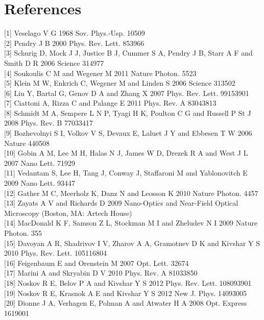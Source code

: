 \documentclass[10pt]{article}
\begin{document}
\section*{References}
[1] Veselago V G 1968 Sov. Phys.-Usp. 10509\\[0pt]
[2] Pendry J B 2000 Phys. Rev. Lett. 853966\\[0pt]
[3] Schurig D, Mock J J, Justice B J, Cummer S A, Pendry J B, Starr A F and Smith D R 2006 Science 314977\\[0pt]
[4] Soukoulis C M and Wegener M 2011 Nature Photon. 5523\\[0pt]
[5] Klein M W, Enkrich C, Wegener M and Linden S 2006 Science 313502\\[0pt]
[6] Liu Y, Bartal G, Genov D A and Zhang X 2007 Phys. Rev. Lett. 99153901\\[0pt]
[7] Ciattoni A, Rizza C and Palange E 2011 Phys. Rev. A 83043813\\[0pt]
[8] Schmidt M A, Sempere L N P, Tyagi H K, Poulton C G and Russell P St J 2008 Phys. Rev. B 77033417\\[0pt]
[9] Bozhevolnyi S I, Volkov V S, Devaux E, Laluet J Y and Ebbesen T W 2006 Nature 440508\\[0pt]
[10] Gobin A M, Lee M H, Halas N J, James W D, Drezek R A and West J L 2007 Nano Lett. 71929\\[0pt]
[11] Vedantam S, Lee H, Tang J, Conway J, Staffaroni M and Yablonovitch E 2009 Nano Lett. 93447\\[0pt]
[12] Gather M C, Meerholz K, Danz N and Leosson K 2010 Nature Photon. 4457\\[0pt]
[13] Zayats A V and Richards D 2009 Nano-Optics and Near-Field Optical Microscopy (Boston, MA: Artech House)\\[0pt]
[14] MacDonald K F, Samson Z L, Stockman M I and Zheludev N I 2009 Nature Photon. 355\\[0pt]
[15] Davoyan A R, Shadrivov I V, Zharov A A, Gramotnev D K and Kivshar Y S 2010 Phys. Rev. Lett. 105116804\\[0pt]
[16] Feigenbaum E and Orenstein M 2007 Opt. Lett. 32674\\[0pt]
[17] Marini A and Skryabin D V 2010 Phys. Rev. A 81033850\\[0pt]
[18] Noskov R E, Belov P A and Kivshar Y S 2012 Phys. Rev. Lett. 108093901\\[0pt]
[19] Noskov R E, Krasnok A E and Kivshar Y S 2012 New J. Phys. 14093005\\[0pt]
[20] Dionne J A, Verhagen E, Polman A and Atwater H A 2008 Opt. Express 1619001\\[0pt]
\end{document}
